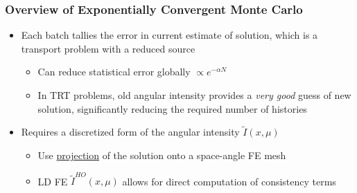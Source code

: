 \documentclass[xcolor=dvipsnames,hyperref={pdfpagelabels=false},unknownkeysallowed]{beamer}
\renewcommand{\u}[1]{\underline{#1}}
\newcommand{\colb}[1]{{\color{blue} #1}}
\newcommand{\colr}[1]{{\color{red} #1}}
\newlength{\wideitemsep}
\let\olditem\item
\renewcommand{\item}{\setlength{\itemsep}{\wideitemsep}\olditem}
\begin{document}
\begin{frame}
    \frametitle{Overview of Exponentially Convergent Monte Carlo}
    \begin{itemize}
        \item Each batch tallies the \colb{error} in current estimate of solution, which
            is a transport problem with a reduced source
            \begin{itemize}
    \item Can reduce statistical error \colb{globally} $\propto e^{-\alpha N}$
    \item In TRT problems, old angular intensity provides a \emph{very good} guess of new
               solution, significantly reducing the required number of histories
\end{itemize}
     \end{itemize}
    \begin{minipage}{0.6\linewidth}
        \vspace{-2.0in}
     \begin{itemize}
        \item Requires a \colr{discretized} form of the angular intensity $\tilde I(x,\mu)$
            \begin{itemize}
                \item Use \u{\colb{projection}} of the solution onto a space-angle FE
                    mesh
        \item LD FE $\tilde  I^{HO}(x,\mu)$ allows for direct computation of
            consistency terms
    \end{itemize}
    \end{itemize}
    \end{minipage}
    \begin{minipage}[t]{0.3\linewidth}
        \centering
    \end{minipage}%
\end{frame}
\end{document}
